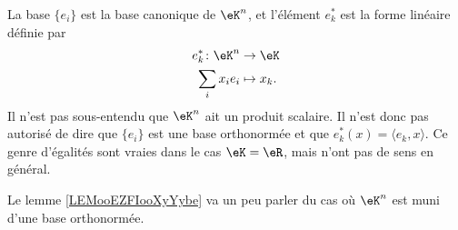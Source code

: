 \begin{normaltext}
    La base \( \{ e_i \}\) est la base canonique de \( \eK^n\), et l'élément \( e_k^*\) est la forme linéaire définie par
    \begin{equation}
        \begin{aligned}
            e_k^*\colon \eK^n&\to \eK \\
            \sum_ix_ie_i&\mapsto x_k. 
        \end{aligned}
    \end{equation}
    Il n'est pas sous-entendu que \( \eK^n\) ait un produit scalaire. Il n'est donc pas autorisé de dire que \( \{ e_i \}\) est une base orthonormée et que \( e^*_k(x)=\langle e_k, x\rangle \). Ce genre d'égalités sont vraies dans le cas \( \eK=\eR\), mais n'ont pas de sens en général.

    Le lemme \ref{LEMooEZFIooXyYybe} va un peu parler du cas où \( \eK^n\) est muni d'une base orthonormée.
\end{normaltext}

